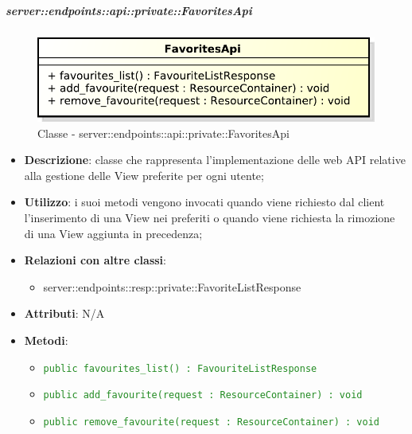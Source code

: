     \subparagraph{server::endpoints::api::private::FavoritesApi} %
    \label{subp:bdsm_app_server_endpoints_api_private_favoritesapi}
	\begin{figure}[!htbp]
		\centering
		\centerline{\includegraphics[scale=0.6]{./images/server/classes/endpoints/favorites_api.pdf}}
		\caption{Classe - server::endpoints::api::private::FavoritesApi}
	\end{figure}
    \begin{itemize}
      \item \textbf{Descrizione}: classe che rappresenta l'implementazione delle web API relative alla gestione delle View preferite per ogni utente;
      \item \textbf{Utilizzo}: i suoi metodi vengono invocati quando viene richiesto dal client l'inserimento di una View nei preferiti o quando viene richiesta la rimozione di una View aggiunta in precedenza;
      \item \textbf{Relazioni con altre classi}:
        \begin{itemize}
          \item server::endpoints::resp::private::FavoriteListResponse
        \end{itemize}
		\item \textbf{Attributi}: N/A
		\item \textbf{Metodi}:
			\begin{itemize}
				\item \textcolor{forestgreen}{\texttt{public favourites\_list() : FavouriteListResponse}}
				\item \textcolor{forestgreen}{\texttt{public add\_favourite(request : ResourceContainer) : void}}
				\item \textcolor{forestgreen}{\texttt{public remove\_favourite(request : ResourceContainer) : void}}
     	 \end{itemize}
      \end{itemize}

